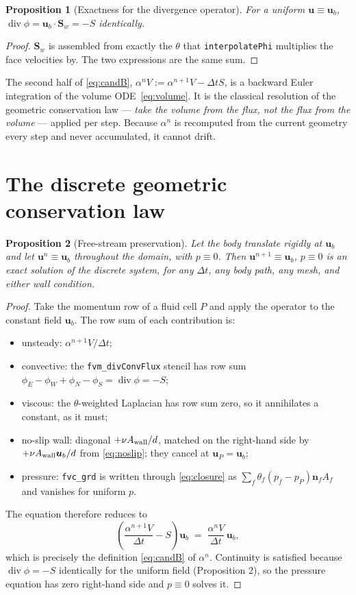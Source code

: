 \documentclass[11pt,a4paper]{article}
\newtheorem{proposition}{Proposition}
\theoremstyle{remark}
\newcommand{\uu}{\bm{u}}
\newcommand{\nn}{\bm{n}}
\newcommand{\Sw}{\bm{S}_w}
\newcommand{\ub}{\uu_b}
\newcommand{\dt}{\Delta t}
\begin{document}
\begin{proposition}[Exactness for the divergence operator]
For a uniform $\uu\equiv\ub$, $\operatorname{div}\phi=\ub\!\cdot\!\Sw=-S$ identically.
\end{proposition}
\begin{proof}
$\Sw$ is assembled from exactly the $\theta$ that \texttt{interpolatePhi} multiplies the face
velocities by. The two expressions are the same sum.
\end{proof}

The second half of \eqref{eq:candB}, $\alpha^{n}V:=\alpha^{n+1}V-\dt S$, is a backward Euler
integration of the volume ODE~\eqref{eq:volume}. It is the classical resolution of the
geometric conservation law --- \emph{take the volume from the flux, not the flux from the
volume} --- applied per step. Because $\alpha^{n}$ is recomputed from the current geometry every
step and never accumulated, it cannot drift.

\section{The discrete geometric conservation law}

\begin{proposition}[Free-stream preservation]
Let the body translate rigidly at $\ub$ and let $\uu^{n}\equiv\ub$ throughout the domain, with
$p\equiv0$. Then $\uu^{n+1}\equiv\ub$, $p\equiv0$ is an exact solution of the discrete system,
for any $\dt$, any body path, any mesh, and either wall condition.
\end{proposition}

\begin{proof}
Take the momentum row of a fluid cell $P$ and apply the operator to the constant field $\ub$.
The row sum of each contribution is:
\begin{itemize}\itemsep2pt
\item unsteady: $\alpha^{n+1}V/\dt$;
\item convective: the \texttt{fvm\_divConvFlux} stencil has row sum
      $\phi_E-\phi_W+\phi_N-\phi_S=\operatorname{div}\phi=-S$;
\item viscous: the $\theta$-weighted Laplacian has row sum zero, so it annihilates a constant,
      as it must;
\item no-slip wall: diagonal $+\nu A_{\rm wall}/d$, matched on the right-hand side by
      $+\nu A_{\rm wall}\ub/d$ from \eqref{eq:noslip}; they cancel at $\uu_P=\ub$;
\item pressure: \texttt{fvc\_grd} is written through \eqref{eq:closure} as
      $\sum_f\theta_f(p_f-p_P)\nn_fA_f$ and vanishes for uniform $p$.
\end{itemize}
The equation therefore reduces to
\begin{equation}
\left(\frac{\alpha^{n+1}V}{\dt}-S\right)\ub \;=\; \frac{\alpha^{n}V}{\dt}\,\ub ,
\end{equation}
which is precisely the definition \eqref{eq:candB} of $\alpha^{n}$. Continuity is satisfied
because $\operatorname{div}\phi=-S$ identically for the uniform field (Proposition 2), so the
pressure equation has zero right-hand side and $p\equiv 0$ solves it.
\end{proof}
\end{document}
